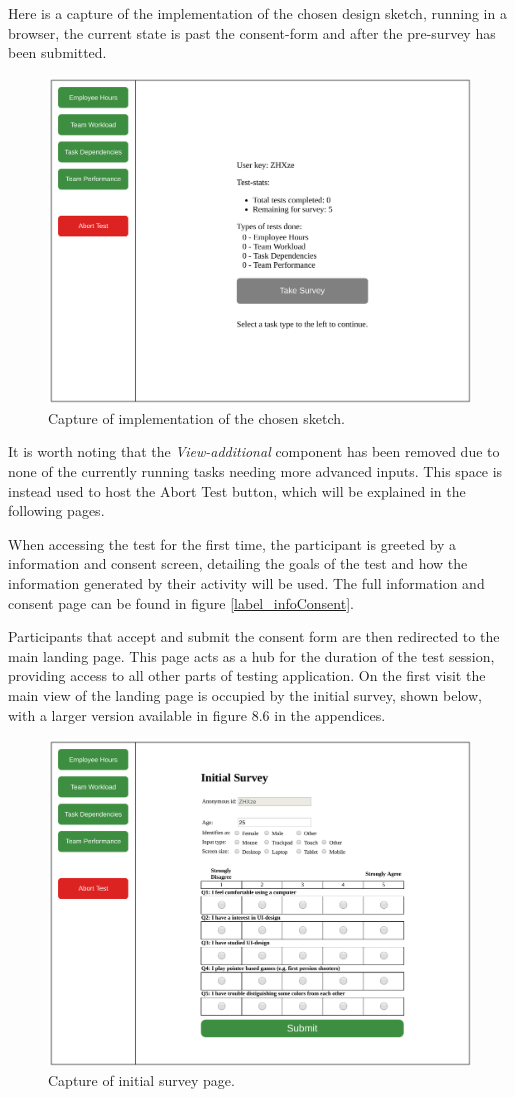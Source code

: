 {	Here is a capture of the implementation of the chosen design sketch, running
	in a browser, the current state is past the consent-form and after the
	pre-survey has been submitted.

	\begin{figure}[h!]
		\centering
		\includegraphics[width=.7\textwidth]{figures/captures/webapp_main_statistics.pdf}
		\caption{Capture of implementation of the chosen sketch.}
		\label{label_mainStatistics}
	\end{figure}

	It is worth noting that the \textit{View-additional} component has been
	removed due to none of the currently running tasks needing more advanced
	inputs. This space is instead used to host the Abort Test button, which will
	be explained in the following pages.

	When accessing the test for the first time, the participant is greeted by a
	information and consent screen, detailing the goals of the test and how the
	information generated by their activity will be used. The full information
	and consent page can be found in figure \ref{label_infoConsent}.

  Participants that accept and submit the consent form are then redirected
  to the main landing page. This page acts as a hub for the duration of
  the test session, providing access to all other parts of testing
  application. On the first visit the main view of the landing page is
  occupied by the initial survey, shown below, with a larger version available
  in figure 8.6 in the appendices.

  \begin{figure}[h!]
    \centering
    \includegraphics[width=.65\textwidth]{figures/captures/webapp_pre_survey.pdf}
    \caption{Capture of initial survey page.}
    \label{label_preSurvey}
  \end{figure}

}
